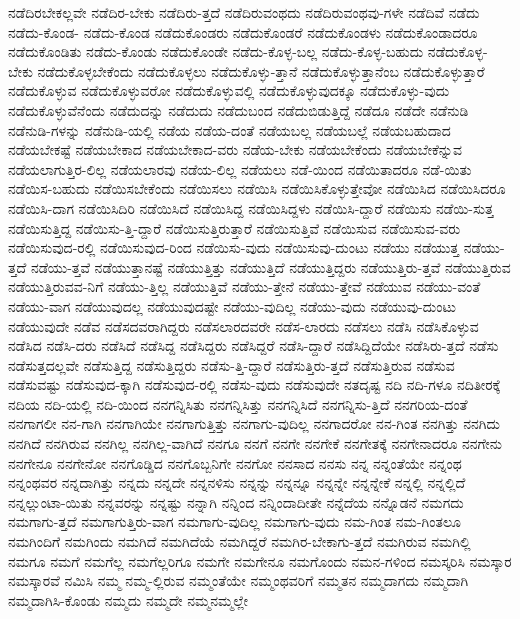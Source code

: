 {ನಡೆದಿರಬೇಕಲ್ಲವೇ
ನಡೆದಿರ-ಬೇಕು
ನಡೆದಿರು-ತ್ತದೆ
ನಡೆದಿರುವಂಥದು
ನಡೆದಿರುವಂಥವು-ಗಳೇ
ನಡೆದಿವೆ
ನಡೆದು
ನಡೆದು-ಕೊಂಡ-
ನಡೆದು-ಕೊಂಡ
ನಡೆದುಕೊಂಡರು
ನಡೆದುಕೊಂಡರೆ
ನಡೆದುಕೊಂಡಳು
ನಡೆದುಕೊಂಡಾದರೂ
ನಡೆದುಕೊಂಡಿತು
ನಡೆದು-ಕೊಂಡು
ನಡೆದುಕೊಂಡೇ
ನಡೆದು-ಕೊಳ್ಳ-ಬಲ್ಲ
ನಡೆದು-ಕೊಳ್ಳ-ಬಹುದು
ನಡೆದುಕೊಳ್ಳ-ಬೇಕು
ನಡೆದುಕೊಳ್ಳಬೇಕೆಂದು
ನಡೆದುಕೊಳ್ಳಲು
ನಡೆದುಕೊಳ್ಳು-ತ್ತಾನೆ
ನಡೆದುಕೊಳ್ಳುತ್ತಾನೆಂಬ
ನಡೆದುಕೊಳ್ಳುತ್ತಾರೆ
ನಡೆದುಕೊಳ್ಳುವ
ನಡೆದುಕೊಳ್ಳುವರೋ
ನಡೆದುಕೊಳ್ಳುವಲ್ಲಿ
ನಡೆದುಕೊಳ್ಳುವುದಕ್ಕೂ
ನಡೆದುಕೊಳ್ಳು-ವುದು
ನಡೆದುಕೊಳ್ಳುವೆನೆಂದು
ನಡೆದುದನ್ನು
ನಡೆದುದು
ನಡೆದುಬಂದ
ನಡೆದುಬಿಡುತ್ತಿದ್ದೆ
ನಡೆದೂ
ನಡೆದೇ
ನಡೆನುಡಿ
ನಡೆನುಡಿ-ಗಳನ್ನು
ನಡೆನುಡಿ-ಯಲ್ಲಿ
ನಡೆಯ
ನಡೆಯ-ದಂತೆ
ನಡೆಯಬಲ್ಲ
ನಡೆಯಬಲ್ಲೆ
ನಡೆಯಬಹುದಾದ
ನಡೆಯಬೇಕಷ್ಟೆ
ನಡೆಯಬೇಕಾದ
ನಡೆಯಬೇಕಾದ-ವರು
ನಡೆಯ-ಬೇಕು
ನಡೆಯಬೇಕೆಂದು
ನಡೆಯಬೇಕೆನ್ನುವ
ನಡೆಯಲಾಗುತ್ತಿರ-ಲಿಲ್ಲ
ನಡೆಯಲಾರವು
ನಡೆಯ-ಲಿಲ್ಲ
ನಡೆಯಲು
ನಡೆ-ಯಿಂದ
ನಡೆಯಿತಾದರೂ
ನಡೆ-ಯಿತು
ನಡೆಯಿಸ-ಬಹುದು
ನಡೆಯಿಸಬೇಕೆಂದು
ನಡೆಯಿಸಲು
ನಡೆಯಿಸಿ
ನಡೆಯಿಸಿಕೊಳ್ಳುತ್ತೇವೋ
ನಡೆಯಿಸಿದ
ನಡೆಯಿಸಿದರೂ
ನಡೆಯಿಸಿ-ದಾಗ
ನಡೆಯಿಸಿದಿರಿ
ನಡೆಯಿಸಿದೆ
ನಡೆಯಿಸಿದ್ದ
ನಡೆಯಿಸಿದ್ದಳು
ನಡೆಯಿಸಿ-ದ್ದಾರೆ
ನಡೆಯಿಸು
ನಡೆಯಿ-ಸುತ್ತ
ನಡೆಯಿಸುತ್ತಿದ್ದ
ನಡೆಯಿಸು-ತ್ತಿ-ದ್ದಾರೆ
ನಡೆಯಿಸುತ್ತಿರುತ್ತಾರೆ
ನಡೆಯಿಸುತ್ತಿವೆ
ನಡೆಯಿಸುವ
ನಡೆಯಿಸುವ-ವರು
ನಡೆಯಿಸುವುದ-ರಲ್ಲಿ
ನಡೆಯಿಸುವುದ-ರಿಂದ
ನಡೆಯಿಸು-ವುದು
ನಡೆಯಿಸುವು-ದುಂಟು
ನಡೆಯು
ನಡೆಯುತ್ತ
ನಡೆಯು-ತ್ತದೆ
ನಡೆಯು-ತ್ತವೆ
ನಡೆಯುತ್ತಾನಷ್ಟೆ
ನಡೆಯುತ್ತಿತ್ತು
ನಡೆಯುತ್ತಿದೆ
ನಡೆಯುತ್ತಿದ್ದರು
ನಡೆಯುತ್ತಿರು-ತ್ತವೆ
ನಡೆಯುತ್ತಿರುವ
ನಡೆಯುತ್ತಿರುವವ-ನಿಗೆ
ನಡೆಯು-ತ್ತಿಲ್ಲ
ನಡೆಯುತ್ತಿವೆ
ನಡೆಯು-ತ್ತೇನೆ
ನಡೆಯು-ತ್ತೇವೆ
ನಡೆಯುವ
ನಡೆಯು-ವಂತೆ
ನಡೆಯು-ವಾಗ
ನಡೆಯುವುದಲ್ಲ
ನಡೆಯುವುದಷ್ಟೇ
ನಡೆಯು-ವುದಿಲ್ಲ
ನಡೆಯು-ವುದು
ನಡೆಯುವು-ದುಂಟು
ನಡೆಯುವುದೇ
ನಡೆವ
ನಡೆಸದವರಾಗಿದ್ದರು
ನಡೆಸಲಾರದವರೇ
ನಡೆಸ-ಲಾರದು
ನಡೆಸಲು
ನಡೆಸಿ
ನಡೆಸಿಕೊಳ್ಳುವ
ನಡೆಸಿದ
ನಡೆಸಿ-ದರು
ನಡೆಸಿದೆ
ನಡೆಸಿದ್ದ
ನಡೆಸಿದ್ದರು
ನಡೆಸಿದ್ದರೆ
ನಡೆಸಿ-ದ್ದಾರೆ
ನಡೆಸಿದ್ದಿದೆಯೇ
ನಡೆಸಿರು-ತ್ತದೆ
ನಡೆಸು
ನಡೆಸುತ್ತದಲ್ಲವೇ
ನಡೆಸುತ್ತಿದ್ದ
ನಡೆಸುತ್ತಿದ್ದರು
ನಡೆಸು-ತ್ತಿ-ದ್ದಾರೆ
ನಡೆಸುತ್ತಿರು-ತ್ತದೆ
ನಡೆಸುತ್ತಿರುವ
ನಡೆಸುವ
ನಡೆಸುವಷ್ಟು
ನಡೆಸುವುದ-ಕ್ಕಾಗಿ
ನಡೆಸುವುದ-ರಲ್ಲಿ
ನಡೆಸು-ವುದು
ನಡೆಸುವುದೇ
ನತದೃಷ್ಟ
ನದಿ
ನದಿ-ಗಳೂ
ನದಿತೀರಕ್ಕೆ
ನದಿಯ
ನದಿ-ಯಲ್ಲಿ
ನದಿ-ಯಿಂದ
ನನಗನ್ನಿಸಿತು
ನನಗನ್ನಿಸಿತ್ತು
ನನಗನ್ನಿಸಿದೆ
ನನಗನ್ನಿಸು-ತ್ತಿದೆ
ನನಗರಿಯ-ದಂತೆ
ನನಗಾಗಲೀ
ನನ-ಗಾಗಿ
ನನಗಾಗಿಯೇ
ನನಗಾಗುತ್ತಿತ್ತು
ನನಗಾಗು-ವುದಿಲ್ಲ
ನನಗಾದರೋ
ನನ-ಗಿಂತ
ನನಗಿತ್ತು
ನನಗಿದು
ನನಗಿದೆ
ನನಗಿರುವ
ನನಗಿಲ್ಲ
ನನಗಿಲ್ಲ-ವಾಗಿದೆ
ನನಗೂ
ನನಗೆ
ನನಗೇ
ನನಗೇಕೆ
ನನಗೇತಕ್ಕೆ
ನನಗೇನಾದರೂ
ನನಗೇನು
ನನಗೇನೂ
ನನಗೇನೋ
ನನಗೊಡ್ಡಿದ
ನನಗೊಬ್ಬನಿಗೇ
ನನಗೋ
ನನಸಾದ
ನನಸು
ನನ್ನ
ನನ್ನಂತೆಯೇ
ನನ್ನಂಥ
ನನ್ನಂಥವರ
ನನ್ನದಾಗಿತ್ತು
ನನ್ನದು
ನನ್ನದೇ
ನನ್ನನಳಿಸು
ನನ್ನನ್ನು
ನನ್ನನ್ನೂ
ನನ್ನನ್ನೇ
ನನ್ನನ್ನೇಕೆ
ನನ್ನಲ್ಲಿ
ನನ್ನಲ್ಲಿದೆ
ನನ್ನಲ್ಲುಂಟಾ-ಯಿತು
ನನ್ನವರನ್ನು
ನನ್ನಷ್ಟು
ನನ್ನಾಗಿ
ನನ್ನಿಂದ
ನನ್ನಿಂದಾದೀತೇ
ನನ್ನೆದೆಯ
ನನ್ನೊಡನೆ
ನಮಗದು
ನಮಗಾಗು-ತ್ತದೆ
ನಮಗಾಗುತ್ತಿರು-ವಾಗ
ನಮಗಾಗು-ವುದಿಲ್ಲ
ನಮಗಾಗು-ವುದು
ನಮ-ಗಿಂತ
ನಮ-ಗಿಂತಲೂ
ನಮಗಿಂದಿಗೆ
ನಮಗಿಂದು
ನಮಗಿದೆ
ನಮಗಿದೆಯೆ
ನಮಗಿದ್ದರೆ
ನಮಗಿರ-ಬೇಕಾಗು-ತ್ತದೆ
ನಮಗಿರುವ
ನಮಗಿಲ್ಲಿ
ನಮಗೂ
ನಮಗೆ
ನಮಗೆಲ್ಲ
ನಮಗೆಲ್ಲರಿಗೂ
ನಮಗೇ
ನಮಗೇನೂ
ನಮಗೊಂದು
ನಮನ-ಗಳಿಂದ
ನಮಸ್ಕರಿಸಿ
ನಮಸ್ಕಾರ
ನಮಸ್ಕಾರವೆ
ನಮಿಸಿ
ನಮ್ಮ
ನಮ್ಮ-ಲ್ಲಿರುವ
ನಮ್ಮಂತೆಯೇ
ನಮ್ಮಂಥವರಿಗೆ
ನಮ್ಮತನ
ನಮ್ಮದಾಗದು
ನಮ್ಮದಾಗಿ
ನಮ್ಮದಾಗಿಸಿ-ಕೊಂಡು
ನಮ್ಮದು
ನಮ್ಮದೇ
ನಮ್ಮನಮ್ಮಲ್ಲೇ
}
